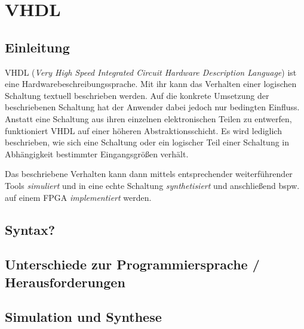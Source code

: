 \chapter{VHDL} %
\label{VHDL} %

\section{Einleitung}
VHDL (\textit{Very High Speed Integrated Circuit Hardware Description Language}) ist eine Hardwarebeschreibungssprache. Mit ihr kann das Verhalten einer logischen Schaltung textuell beschrieben werden. Auf die konkrete Umsetzung der beschriebenen Schaltung hat der Anwender dabei jedoch nur bedingten Einfluss. Anstatt eine Schaltung aus ihren einzelnen elektronischen Teilen zu entwerfen, funktioniert VHDL auf einer höheren Abstraktionsschicht. Es wird lediglich beschrieben, wie sich eine Schaltung oder ein logischer Teil einer Schaltung in Abhängigkeit bestimmter Eingangsgrößen verhält.

Das beschriebene Verhalten kann dann mittels entsprechender weiterführender Tools \textit{simuliert} und in eine echte Schaltung \textit{synthetisiert} und anschließend bspw. auf einem FPGA \textit{implementiert} werden.

\section{Syntax?}

\section{Unterschiede zur Programmiersprache / Herausforderungen}

\section{Simulation und Synthese}
